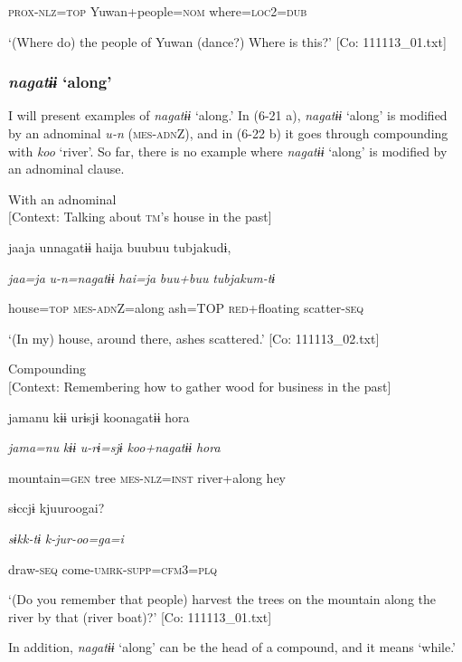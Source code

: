       \textsc{prox}-\textsc{nlz}=\textsc{top}  Yuwan+people=\textsc{nom}  where=\textsc{loc}2=\textsc{dub}

\glt ‘(Where do) the people of Yuwan (dance?) Where is this?’ [Co: 111113\_01.txt]
\z

\subsubsection{\textit{nagatɨɨ} ‘along’}

I will present examples of \textit{nagatɨɨ} ‘along.’ In (6-21 a), \textit{nagatɨɨ} ‘along’ is modified by an adnominal \textit{u-n} (\textsc{mes}-\textsc{adn}Z), and in (6-22 b) it goes through compounding with \textit{koo} ‘river’. So far, there is no example where \textit{nagatɨɨ} ‘along’ is modified by an adnominal clause.

\ea\label{ex:6-22}
\ea With an adnominal\\{}
[Context: Talking about \textsc{tm}’s house in the past]

{\TM}
\gll jaaja  unnagatɨɨ  haija  buubuu  tubjakudɨ,

      \textit{jaa=ja}  \textit{u-n=nagatɨɨ}  \textit{hai=ja}  \textit{buu+buu}  \textit{tubjakum-tɨ}

      house=\textsc{top}  \textsc{mes}-\textsc{adn}Z=along  ash=TOP  \textsc{red}+floating  scatter-\textsc{seq}

\glt ‘(In my) house, around there, ashes scattered.’ [Co: 111113\_02.txt]
\z

 \ex Compounding\\{}
[Context: Remembering how to gather wood for business in the past]

{\TM}
\gll jamanu  kɨɨ  urɨsjɨ  koonagatɨɨ  {\textbar}hora{\textbar}

      \textit{jama=nu}  \textit{kɨɨ}  \textit{u-rɨ=sjɨ}  \textit{koo+nagatɨɨ}  \textit{hora}

      mountain=\textsc{gen}  tree  \textsc{mes}-\textsc{nlz}=\textsc{inst}  river+along  hey

      sɨccjɨ  kjuuroogai?

      \textit{sɨkk-tɨ}  \textit{k-jur-oo=ga=i}

      draw-\textsc{seq}  come-\textsc{umrk}-\textsc{supp}=\textsc{cfm}3=\textsc{plq}

\glt ‘(Do you remember that people) harvest the trees on the mountain along the river by that (river boat)?’ [Co: 111113\_01.txt]
\z

In addition, \textit{nagatɨɨ} ‘along’ can be the head of a compound, and it means ‘while.’

